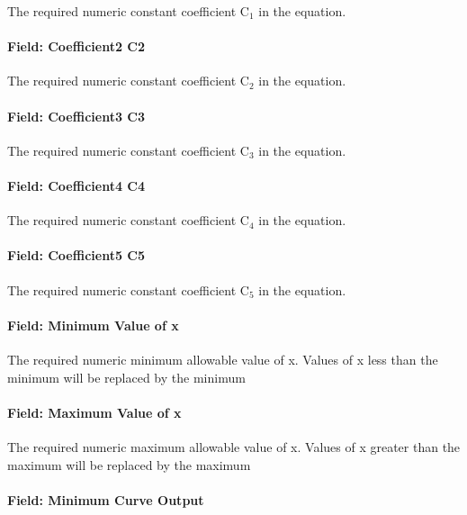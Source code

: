 The required numeric constant coefficient C\(_{1}\) in the equation.

\paragraph{Field: Coefficient2 C2}\label{field-coefficient2-c2-5}

The required numeric constant coefficient C\(_{2}\) in the equation.

\paragraph{Field: Coefficient3 C3}\label{field-coefficient3-c3-5}

The required numeric constant coefficient C\(_{3}\) in the equation.

\paragraph{Field: Coefficient4 C4}\label{field-coefficient4-c4-2}

The required numeric constant coefficient C\(_{4}\) in the equation.

\paragraph{Field: Coefficient5 C5}\label{field-coefficient5-c5-1}

The required numeric constant coefficient C\(_{5}\) in the equation.

\paragraph{Field: Minimum Value of x}\label{field-minimum-value-of-x-17}

The required numeric minimum allowable value of x. Values of x less than the minimum will be replaced by the minimum

\paragraph{Field: Maximum Value of x}\label{field-maximum-value-of-x-18}

The required numeric maximum allowable value of x. Values of x greater than the maximum will be replaced by the maximum

\paragraph{Field: Minimum Curve Output}\label{field-minimum-curve-output-17}

